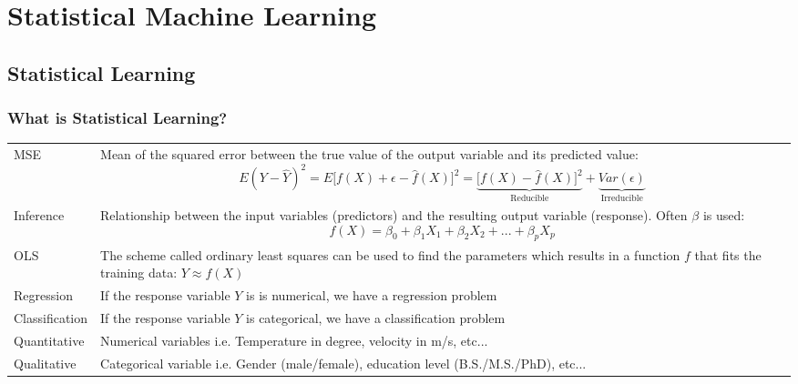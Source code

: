 \section{Statistical Machine Learning}
\subsection{Statistical Learning}
\subsubsection{What is Statistical Learning?}
\begin{onehalfspace}
	\begin{tabularx}{\textwidth}{p{3cm}X}
		MSE & Mean of the squared error between the true value of the output variable and its predicted value:
		\[ E(Y-\hat{Y})^2 = E\lbrack f(X)+\epsilon -\hat{f} (X)\rbrack ^2 = \underbrace{\lbrack f(X) -\hat{f} (X)\rbrack
			^2}_\text{Reducible} + \underbrace{Var(\epsilon ) }_\text{Irreducible} \] \\
		Inference &  Relationship between the input variables (predictors) and the resulting output variable (response). 
		Often $\beta$ is used:
		\[ f(X) = \beta_0 + \beta_1 X_1 + \beta_2 X_2 + ... + \beta_p X_p \] \\
		OLS & The scheme called ordinary least squares can be used to find the parameters which results in a function $f$ 
		that fits the training data: \( Y \approx{} f(X) \) \\
		Regression & If the response variable $Y$ is is numerical, we have a regression problem \\
		Classification & If the response variable $Y$ is categorical, we have a classification problem \\
		Quantitative & Numerical variables i.e. Temperature in degree, velocity in m/s, etc... \\
		Qualitative & Categorical variable i.e. Gender (male/female), education level (B.S./M.S./PhD), etc... \\
	\end{tabularx}
\end{onehalfspace}


